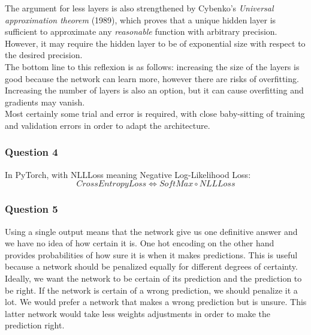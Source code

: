 \documentclass[12pt]{article}
\begin{document}
The argument for less layers is also strengthened by Cybenko's \textit{Universal approximation theorem} (1989), which proves that a unique hidden layer is sufficient to approximate any \textit{reasonable} function with arbitrary precision.
However, it may require the hidden layer to be of exponential size with respect to the desired precision. \\
The bottom line to this reflexion is as follows: increasing the size of the layers is good because the network can learn more, however there are risks of overfitting.
Increasing the number of layers is also an option, but it can cause overfitting and gradients may vanish. \\
Most certainly some trial and error is required, with close baby-sitting of training and validation errors in order to adapt the architecture.


\subsubsection{Question 4}
In PyTorch, with NLLLoss meaning  Negative Log-Likelihood Loss:
\begin{equation}
  CrossEntropyLoss \iff SoftMax \circ NLLLoss
\end{equation}

\subsubsection{Question 5}
Using a single output means that the network give us one definitive answer and we have no idea of how certain it is.
One hot encoding on the other hand provides probabilities of how sure it is when it makes predictions.
This is useful because a network should be penalized equally for different degrees of certainty.
Ideally, we want the network to be certain of its prediction and the prediction to be right.
If the network is certain of a wrong prediction, we should penalize it a lot.
We would prefer a network that makes a wrong prediction but is unsure.
This latter network would take less weights adjustments in order to make the prediction right.
\end{document}
